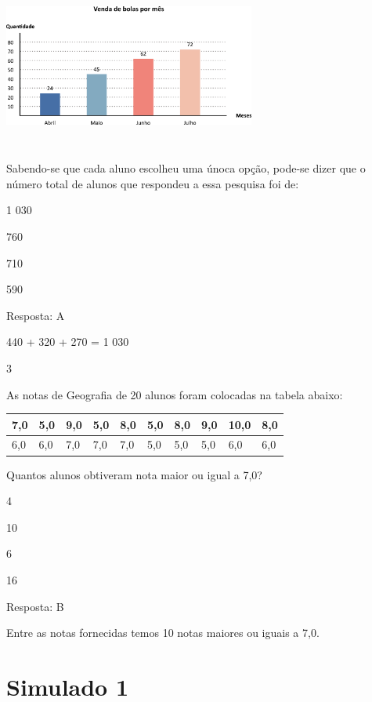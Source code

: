 \begin{escolha}
\begin{escolha}
\includegraphics[width=3.25862in,height=2.14185in]{media/image105.png}

Sabendo-se que cada aluno escolheu uma únoca opção, pode-se dizer que o
número total de alunos que respondeu a essa pesquisa foi de:

\begin{escolha}
\item
  1 030
\item
  760
\item
  710
\item
  590
\end{escolha}

Resposta: A

440 + 320 + 270 = 1 030

\num{3}

As notas de Geografia de 20 alunos foram colocadas na tabela abaixo:

\begin{longtable}[]{@{}llllllllll@{}}
\toprule
7,0 & 5,0 & 9,0 & 5,0 & 8,0 & 5,0 & 8,0 & 9,0 & 10,0 &
8,0\tabularnewline
\midrule
\endhead
6,0 & 6,0 & 7,0 & 7,0 & 7,0 & 5,0 & 5,0 & 5,0 & 6,0 & 6,0\tabularnewline
\bottomrule
\end{longtable}

Quantos alunos obtiveram nota maior ou igual a 7,0?

\begin{escolha}
\item
  4
\item
  10
\item
  6
\item
  16
\end{escolha}

Resposta: B

Entre as notas fornecidas temos 10 notas maiores ou iguais a 7,0.

\chapter{Simulado 1}


\end{escolha}
\end{escolha}
